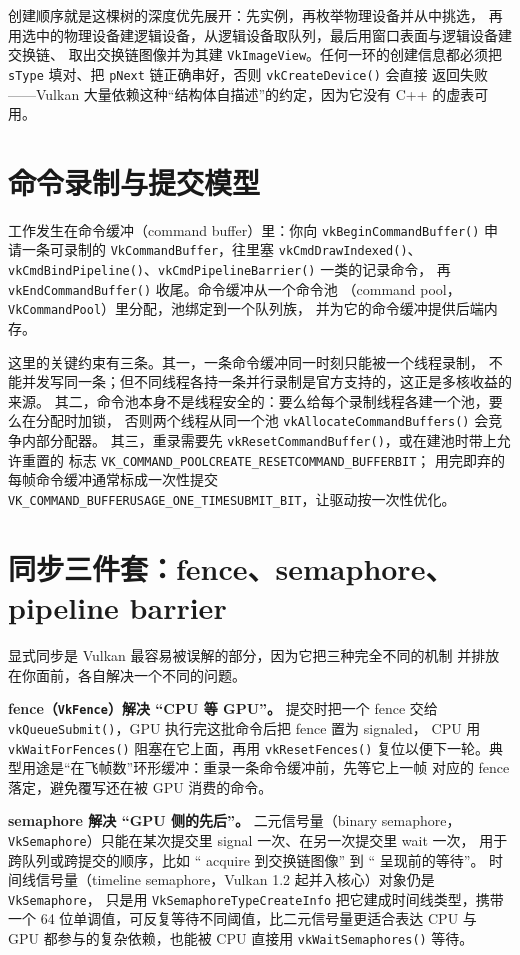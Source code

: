 \documentclass[12pt,a4paper,fontset=fandol]{ctexbook}
\newcommand{\Fn}[1]{\texttt{#1()}}
\newcommand{\Tp}[1]{\texttt{#1}}
\newcommand{\Bk}{\discretionary{}{}{}}
\newcommand{\Lang}[1]{\textsf{#1}}
\newcommand{\DomCPU}{\Lang{CPU}}
\newcommand{\DomGPU}{\Lang{GPU}}
\begin{document}
创建顺序就是这棵树的深度优先展开：先实例，再枚举物理设备并从中挑选，
再用选中的物理设备建逻辑设备，从逻辑设备取队列，最后用窗口表面与逻辑设备建交换链、
取出交换链图像并为其建 \Tp{Vk\Bk Image\Bk View}。任何一环的创建信息都必须把
\Tp{sType} 填对、把 \Tp{pNext} 链正确串好，否则 \Fn{vkCreate\Bk Device} 会直接
返回失败——Vulkan 大量依赖这种``结构体自描述''的约定，因为它没有 C++ 的虚表可用。

\section{命令录制与提交模型}

工作发生在命令缓冲（command buffer）里：你向 \Fn{vkBegin\Bk Command\Bk Buffer}
申请一条可录制的 \Tp{VkCommand\Bk Buffer}，往里塞 \Fn{vkCmd\Bk Draw\Bk Indexed}、
\Fn{vkCmd\Bk Bind\Bk Pipeline}、\Fn{vkCmd\Bk Pipeline\Bk Barrier} 一类的记录命令，
再 \Fn{vkEnd\Bk Command\Bk Buffer} 收尾。命令缓冲从一个命令池
（command pool，\Tp{VkCommand\Bk Pool}）里分配，池绑定到一个队列族，
并为它的命令缓冲提供后端内存。

这里的关键约束有三条。其一，一条命令缓冲同一时刻只能被一个线程录制，
不能并发写同一条；但不同线程各持一条并行录制是官方支持的，这正是多核收益的来源。
其二，命令池本身不是线程安全的：要么给每个录制线程各建一个池，要么在分配时加锁，
否则两个线程从同一个池 \Fn{vkAllocate\Bk Command\Bk Buffers} 会竞争内部分配器。
其三，重录需要先 \Fn{vkReset\Bk Command\Bk Buffer}，或在建池时带上允许重置的
标志 \Tp{VK\_COMMAND\_POOL\Bk CREATE\_RESET\Bk COMMAND\_BUFFER\Bk BIT}；
用完即弃的每帧命令缓冲通常标成一次性提交
\Tp{VK\_COMMAND\_BUFFER\Bk USAGE\_ONE\_TIME\Bk SUBMIT\_BIT}，让驱动按一次性优化。

\section{同步三件套：fence、semaphore、pipeline barrier}

显式同步是 Vulkan 最容易被误解的部分，因为它把三种完全不同的机制
并排放在你面前，各自解决一个不同的问题。

\textbf{fence（\Tp{VkFence}）解决 ``\DomCPU{} 等 \DomGPU{}''。} 提交时把一个 fence
交给 \Fn{vkQueue\Bk Submit}，\DomGPU{} 执行完这批命令后把 fence 置为 signaled，
\DomCPU{} 用 \Fn{vkWait\Bk For\Bk Fences} 阻塞在它上面，再用 \Fn{vkReset\Bk Fences}
复位以便下一轮。典型用途是``在飞帧数''环形缓冲：重录一条命令缓冲前，先等它上一帧
对应的 fence 落定，避免覆写还在被 \DomGPU{} 消费的命令。

\textbf{semaphore 解决 ``\DomGPU{} 侧的先后''。} 二元信号量（binary semaphore，
\Tp{Vk\Bk Semaphore}）只能在某次提交里 signal 一次、在另一次提交里 wait 一次，
用于跨队列或跨提交的顺序，比如 `` acquire 到交换链图像'' 到 `` 呈现前的等待''。
时间线信号量（timeline semaphore，Vulkan 1.2 起并入核心）对象仍是 \Tp{Vk\Bk Semaphore}，
只是用 \Tp{Vk\Bk Semaphore\Bk Type\Bk Create\Bk Info} 把它建成时间线类型，携带一个
64 位单调值，可反复等待不同阈值，比二元信号量更适合表达 \DomCPU{} 与 \DomGPU{}
都参与的复杂依赖，也能被 \DomCPU{} 直接用 \Fn{vkWait\Bk Semaphores} 等待。
\end{document}
